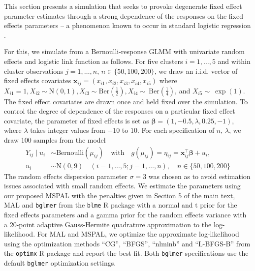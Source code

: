 \documentclass[11pt, a4paper]{article}
\newcommand*{\bb}{\boldsymbol}
\theoremstyle{example} \newtheorem{example}{Example}[section]
\theoremstyle{theorem} \newtheorem{theorem}{Theorem}[section]
\theoremstyle{theorem }\newtheorem{proposition}{Proposition}[section]
\theoremstyle{theorem }\newtheorem{corollary}{Corollary}[section]
\def\\bbeta{\bb{\\bbeta}}
\def\bx{\bb{x}}
\begin{document}
This section presents a simulation that seeks to provoke degenerate fixed effect parameter estimates through a strong dependence of the responses on the fixed effects parameters -- a phenomenon known to occur in standard logistic regression \citep{albert1984existence,kosmidis2021jeffreys}.

For this, we simulate from a Bernoulli-response GLMM with univariate random effects and logistic link function as follows. For five clusters $i=1,\ldots,5$ and within cluster observations $j=1,\ldots,n$, $n \in \{50,100,200\}$, we draw an i.i.d. vector of fixed effects covariates $\bx_{ij} = (x_{i1},x_{i2},x_{i3},x_{i4},x_{i5})$ where $X_{i1}=1, {X}_{i2} \sim \text{N}(0,1), {X}_{i3}\sim \textrm{Ber}\left(\frac{1}{2}\right), {X}_{i4}\sim~\textrm{Ber}\left(\frac{1}{4}\right)$, and ${X}_{i5}\sim~\exp(1)$. The fixed effect covariates are drawn once and held fixed over the simulation. To control the degree of dependence of the responses on a particular fixed effect covariate, the parameter of fixed effects is set as $\bb \beta=(1,-0.5,\lambda,0.25,-1)$, where $\lambda$ takes integer values from $-10$ to $10$. For each specification of $n$, $\lambda$, we draw 100 samples from the model 
\begin{equation}
	\begin{aligned}
		\label{eq:sim1_model} 
		Y_{ij} \mid {u}_i & \sim \text{Bernoulli}(\mu_{ij}) \quad \text{with} \quad
		g(\mu_{ij}) = \eta_{ij} = \bx_{ij}^\top \bb \beta + u_i,\\
		u_i & \sim \text{N}(0, 9)  \quad (i = 1, \ldots, 5; j = 1, \ldots, n), \quad n\in \{50,100,200\}
	\end{aligned}
\end{equation}
The random effects dispersion parameter $\sigma = 3$ was chosen as to avoid estimation issues associated with small random effects. We estimate the parameters using our proposed MSPAL with the penalties given in Section 5 of the main text, MAL and \texttt{bglmer}  from the \texttt{blme} R package \citep{blme} with a normal and t prior for the fixed effects parameters and a gamma prior for the random effects variance with a 20-point adaptive Gauss-Hermite quadrature approximation to the log-likelihood. For MAL and MSPAL, we optimize the approximate log-likelihood using the optimization methods ``CG'', ``BFGS'', ``nlminb'' and ``L-BFGS-B'' from the \texttt{optimx} R package \citep{nash+varadhan:2011} and report the best fit. Both \texttt{bglmer} specifications use the default \texttt{bglmer} optimization settings. 
\end{document}
